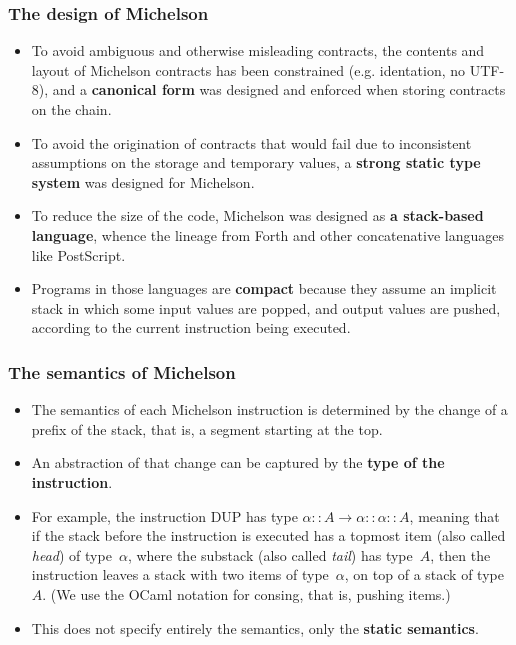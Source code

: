 \documentclass[compress,dvips,xcolor={dvipsnames},t]{beamer}
\begin{document}
\begin{frame}
  \frametitle{The design of Michelson}

  \begin{itemize}

    \item To avoid ambiguous and otherwise misleading contracts, the
      contents and layout of Michelson contracts has been constrained
      (e.g. identation, no UTF-8), and a \textbf{canonical form} was
      designed and enforced when storing contracts on the chain.

    \item To avoid the origination of contracts that would fail due to
      inconsistent assumptions on the storage and temporary values, a
      \textbf{strong static type system} was designed for Michelson.

    \item To reduce the size of the code, Michelson was designed as
      \textbf{a stack-based language}, whence the lineage from Forth
      and other concatenative languages like PostScript.

    \item Programs in those languages are \textbf{compact} because
      they assume an implicit stack in which some input values are
      popped, and output values are pushed, according to the current
      instruction being executed.

  \end{itemize}

\end{frame}

\begin{frame}
  \frametitle{The semantics of Michelson}

  \begin{itemize}

    \item The semantics of each Michelson instruction is determined by
      the change of a prefix of the stack, that is, a segment starting
      at the top.

    \item An abstraction of that change can be captured by the
      \textbf{type of the instruction}.

    \item For example, the instruction \textsf{DUP} has type
      \(\alpha::A \rightarrow \alpha::\alpha::A\), meaning that if the
      stack before the instruction is executed has a topmost item
      (also called \emph{head}) of type~\(\alpha\), where the substack
      (also called \emph{tail}) has type~\(A\), then the instruction
      leaves a stack with two items of type~\(\alpha\), on top of a
      stack of type~\(A\). (We use the OCaml notation for consing,
      that is, pushing items.)

    \item This does not specify entirely the semantics, only the
      \textbf{static semantics}.

  \end{itemize}

\end{frame}
\end{document}
